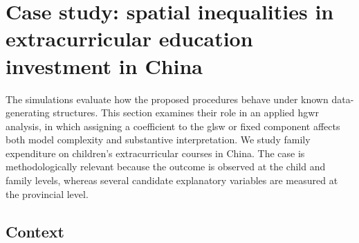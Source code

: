 \documentclass[times]{interact}
\theoremstyle{plain}%
\theoremstyle{definition}
\theoremstyle{remark}
\begin{document}

\section{Case study: spatial inequalities in extracurricular education investment in China}\label{sec:qoe-case}

The simulations evaluate how the proposed procedures behave under known data-generating structures.
This section examines their role in an applied \gls{hgwr} analysis, in which assigning a coefficient to the \gls{glsw} or fixed component affects both model complexity and substantive interpretation.
We study family expenditure on children's extracurricular courses in China.
The case is methodologically relevant because the outcome is observed at the child and family levels, whereas several candidate explanatory variables are measured at the provincial level.

\subsection{Context}\label{sec:qoe-context}
\end{document}
